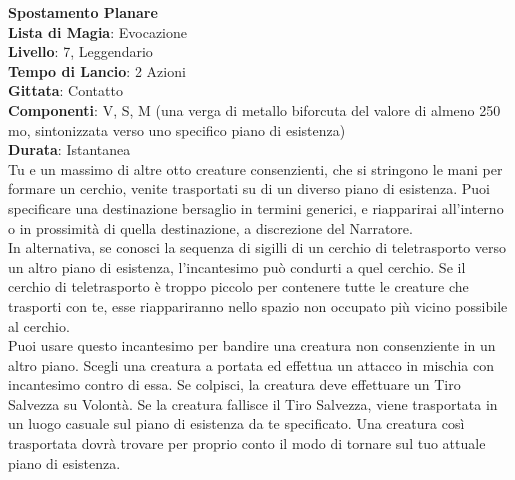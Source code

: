 \documentclass[a4paper,twoside,openany]{book}
\begin{document}
\begin{multicols}{2}
\medskip\textbf{Spostamento Planare}\\
\textbf{Lista di Magia}: Evocazione\\
\textbf{Livello}: 7, Leggendario\\
\textbf{Tempo di Lancio}: 2 Azioni\\
\textbf{Gittata}: Contatto\\
\textbf{Componenti}: V, S, M (una verga di metallo biforcuta del valore di almeno 250 mo, sintonizzata verso uno specifico piano di esistenza)\\
\textbf{Durata}: Istantanea\\
Tu e un massimo di altre otto creature consenzienti, che si stringono le mani per formare un cerchio, venite trasportati su di un diverso piano di esistenza. Puoi specificare una destinazione bersaglio in termini generici, e riapparirai all'interno o in prossimità di quella destinazione, a discrezione del Narratore.\\
In alternativa, se conosci la sequenza di sigilli di un cerchio di teletrasporto verso un altro piano di esistenza, l'incantesimo può condurti a quel cerchio. Se il cerchio di teletrasporto è troppo piccolo per contenere tutte le creature che trasporti con te, esse riappariranno nello spazio non occupato più vicino possibile al cerchio.\\
Puoi usare questo incantesimo per bandire una creatura non consenziente in un altro piano. Scegli una creatura a portata ed effettua un attacco in mischia con incantesimo contro di essa. Se colpisci, la creatura deve effettuare un Tiro Salvezza su Volontà. Se la creatura fallisce il Tiro Salvezza, viene trasportata in un luogo casuale sul piano di esistenza da te specificato. Una creatura così trasportata dovrà trovare per proprio conto il modo di tornare sul tuo attuale piano di esistenza.


\end{multicols}
\end{document}

